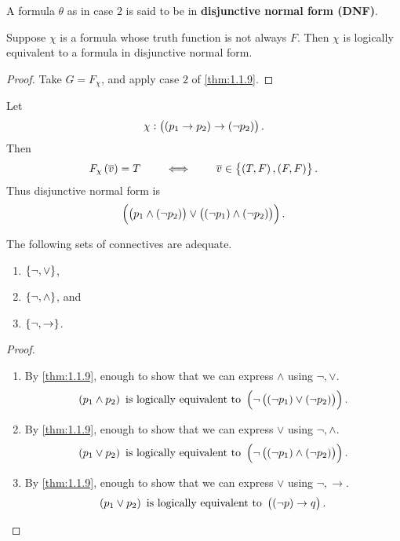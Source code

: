 A formula $ \theta $ as in case $ 2 $ is said to be in \textbf{disjunctive normal form (DNF)}.

\begin{corollary}
Suppose $ \chi $ is a formula whose truth function is not always $ F $. Then $ \chi $ is logically equivalent to a formula in disjunctive normal form.
\end{corollary}

\begin{proof}
Take $ G = F_\chi $, and apply case $ 2 $ of \ref{thm:1.1.9}.
\end{proof}

\begin{example*}
Let
$$ \chi : \impb{\impb{p_1}{p_2}}{\notb{p_2}}. $$
Then
$$ F_\chi\br{\overline{v}} = T \qquad \iff \qquad \overline{v} \in \cbr{\br{T, F}, \br{F, F}}. $$
Thus disjunctive normal form is
$$ \orb{\andb{p_1}{\notb{p_2}}}{\andb{\notb{p_1}}{\notb{p_2}}}. $$
\end{example*}

\pagebreak

\begin{corollary}
The following sets of connectives are adequate.
\begin{enumerate}
\item $ \cbr{\neg, \lor} $,
\item $ \cbr{\neg, \land} $, and
\item $ \cbr{\neg, \rightarrow} $.
\end{enumerate}
\end{corollary}

\begin{proof}
\hfill
\begin{enumerate}
\item By \ref{thm:1.1.9}, enough to show that we can express $ \land $ using $ \neg, \lor $.
$$ \andb{p_1}{p_2} \ \text{is logically equivalent to} \ \notb{\orb{\notb{p_1}}{\notb{p_2}}}. $$
\item By \ref{thm:1.1.9}, enough to show that we can express $ \lor $ using $ \neg, \land $.
$$ \orb{p_1}{p_2} \ \text{is logically equivalent to} \ \notb{\andb{\notb{p_1}}{\notb{p_2}}}. $$
\item By \ref{thm:1.1.9}, enough to show that we can express $ \lor $ using $ \neg, \rightarrow $.
$$ \orb{p_1}{p_2} \ \text{is logically equivalent to} \ \impb{\notb{p}}{q}. $$
\end{enumerate}
\end{proof}



